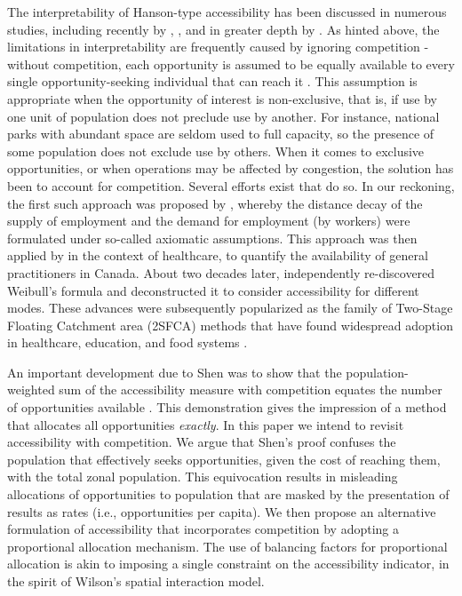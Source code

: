 \documentclass[]{elsarticle} %
\begin{document}
The interpretability of Hanson-type accessibility has been discussed in
numerous studies, including recently by \citet{hu_2019_measuring},
\citet{kelobonye2020measuring}, and in greater depth by
\citet{merlin2017competition}. As hinted above, the limitations in
interpretability are frequently caused by ignoring competition - without
competition, each opportunity is assumed to be equally available to
every single opportunity-seeking individual that can reach it
\citep{shen1998, paez2019, kelobonye2020measuring}. This assumption is
appropriate when the opportunity of interest is non-exclusive, that is,
if use by one unit of population does not preclude use by another. For
instance, national parks with abundant space are seldom used to full
capacity, so the presence of some population does not exclude use by
others. When it comes to exclusive opportunities, or when operations may
be affected by congestion, the solution has been to account for
competition. Several efforts exist that do so. In our reckoning, the
first such approach was proposed by \citet{weibull_axiomatic_1976},
whereby the distance decay of the supply of employment and the demand
for employment (by workers) were formulated under so-called axiomatic
assumptions. This approach was then applied by \citet{joseph1984} in the
context of healthcare, to quantify the availability of general
practitioners in Canada. About two decades later, \citet{shen1998}
independently re-discovered Weibull's
\citeyearpar{weibull_axiomatic_1976} formula \citep[see footnote (7)
in][]{shen1998} and deconstructed it to consider accessibility for
different modes. These advances were subsequently popularized as the
family of Two-Stage Floating Catchment area (2SFCA) methods
\citep{luo2003} that have found widespread adoption in healthcare,
education, and food systems
\citep{yang_comparing_2006, chen_spatial_2020, ye_spatial_2018, chen_enhancing_2019, chen_evaluating_2020}.

An important development due to Shen was to show that the
population-weighted sum of the accessibility measure with competition
equates the number of opportunities available \citep[footnote (7) and
Appendix A in][]{shen1998}. This demonstration gives the impression of a
method that allocates all opportunities \emph{exactly}. In this paper we
intend to revisit accessibility with competition. We argue that Shen's
proof confuses the population that effectively seeks opportunities,
given the cost of reaching them, with the total zonal population. This
equivocation results in misleading allocations of opportunities to
population that are masked by the presentation of results as rates
(i.e., opportunities per capita). We then propose an alternative
formulation of accessibility that incorporates competition by adopting a
proportional allocation mechanism. The use of balancing factors for
proportional allocation is akin to imposing a single constraint on the
accessibility indicator, in the spirit of Wilson's
\citeyearpar{wilson1971} spatial interaction model.
\end{document}
